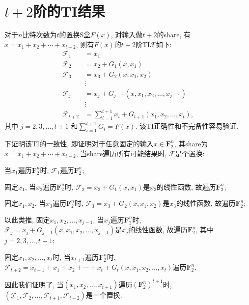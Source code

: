 \documentclass[a4paper,12pt]{ctexart}
\newcommand{\F}{\mathbf{F}}
\begin{document}
\section*{$t+2$阶的TI结果}
    对于$n$比特次数为$t$的置换S盒$F(x)$, 对输入做$t+2$的share, 有$x=x_1+x_2+\cdots+x_{t+2}$, 则有$F(x)$的$t+2$阶TI$\mathcal{F}$如下:
    \begin{align}
        \mathcal{F}_1 &= x_1\\
        \mathcal{F}_2 &= x_2+G_1(x,x_1)\\
        \mathcal{F}_3 &= x_3+G_2(x,x_1,x_2)\\
        &\vdots\\
        \mathcal{F}_j &= x_j+G_{j-1}(x,x_1,x_2,\dots,x_{j-1})\\
        &\vdots\\
        \mathcal{F}_{t+2} &= \sum_{i=1}^{t+1}x_i + G_{t+1}(x_1,x_2,\dots,x_t),
    \end{align}
    其中 $j=2,3,...,t+1$ 和$\sum_{i=1}^{t+1}G_i=F(x)$. 
    该TI正确性和不完备性容易验证.

    下证明该TI的一致性, 即证明对于任意固定的输入$x\in\F_2^n$, 其share为$x=x_1+x_2+\cdots+x_{t+2}$, 当share遍历所有可能结果时, $\mathcal{F}$是个置换:

    当$x_1$遍历$\F_2^n$时, $\mathcal{F}_1$遍历$\F_2^n$;

    固定$x_1$, 当$x_2$遍历$\F_2^n$时, $\mathcal{F}_2=x_2+G_1(x,x_1)$是$x_2$的线性函数, 故遍历$\F_2^n$;

    固定$x_1,x_2$, 当$x_3$遍历$\F_2^n$时, $\mathcal{F}_3=x_3+G_2(x,x_1,x_2)$是$x_3$的线性函数, 故遍历$\F_2^n$;

    以此类推, 固定$x_1,x_2,\dots,x_{j-1}$, 当$x_j$遍历$\F_2^n$时, $\mathcal{F}_j=x_j+G_{j-1}(x,x_1,x_2,\dots,x_{j-1})$是$x_j$的线性函数, 故遍历$\F_2^n$, 其中$j=2,3,\dots,t+1$;
    
    固定$x_1,x_2,\dots,x_t$时, 当$x_{t+1}$遍历$\F_2^n$时, $\mathcal{F}_{t+2}=x_{t+1}+x_1+x_2+\cdots+x_t+G_t(x,x_1,x_2,\dots,x_t)$遍历$\F_2^n$.

    因此我们证明了, 当$(x_1,x_2,\dots,x_{t+1})$遍历$(\F_2^n)^{t+1}$时, $(\mathcal{F}_1,\mathcal{F}_2,\dots,\mathcal{F}_{t+1},\mathcal{F}_{t+2})$是一个置换.
\end{document}
